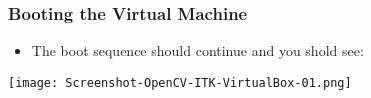 \begin{frame}
\frametitle{Booting the Virtual Machine}
\begin{itemize}
\item The boot sequence should continue and you shold see:
\end{itemize}
\begin{center}
  \texttt{[image: Screenshot-OpenCV-ITK-VirtualBox-01.png]}
\end{center}
\end{frame}

